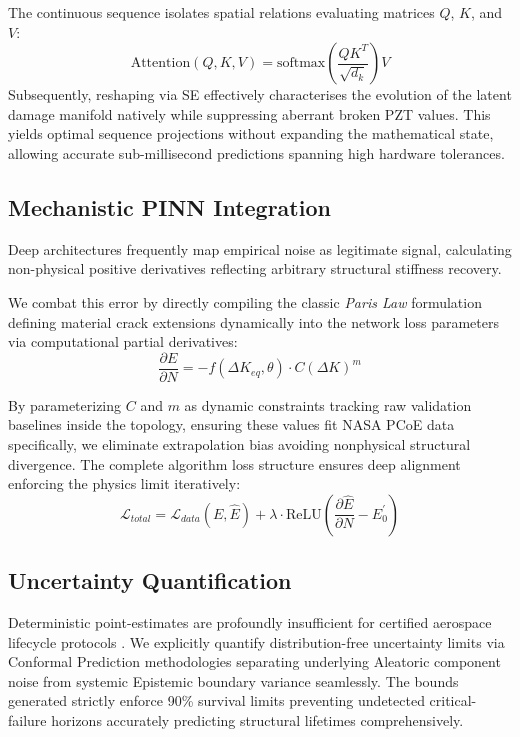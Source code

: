 \documentclass[conference]{IEEEtran}
\begin{document}
The continuous sequence isolates spatial relations evaluating matrices $Q$, $K$, and $V$:
\begin{equation} \label{eq:attention}
\text{Attention}(Q, K, V) = \text{softmax}\left(\frac{QK^T}{\sqrt{d_k}}\right)V
\end{equation}
Subsequently, reshaping via SE effectively characterises the evolution of the latent damage manifold natively while suppressing aberrant broken PZT values. This yields optimal sequence projections without expanding the mathematical state, allowing accurate sub-millisecond predictions spanning high hardware tolerances.

\subsection{Mechanistic PINN Integration}

Deep architectures frequently map empirical noise as legitimate signal, calculating non-physical positive derivatives reflecting arbitrary structural stiffness recovery. 

We combat this error by directly compiling the classic \textit{Paris Law} formulation defining material crack extensions \cite{paris1961critical} dynamically into the network loss parameters via computational partial derivatives:
\begin{equation}
\frac{\partial E}{\partial N} = -f(\Delta K_{eq}, \theta) \cdot C(\Delta K)^m
\end{equation}

By parameterizing $C$ and $m$ as dynamic constraints tracking raw validation baselines inside the topology, ensuring these values fit NASA PCoE data specifically, we eliminate extrapolation bias avoiding nonphysical structural divergence. The complete algorithm loss structure ensures deep alignment enforcing the physics limit iteratively:
\begin{equation}
\mathcal{L}_{total} = \mathcal{L}_{data}(E, \hat{E}) + \lambda \cdot \text{ReLU}\left( \frac{\partial \hat{E}}{\partial N} - E_0^\prime \right)
\end{equation}

\subsection{Uncertainty Quantification}

Deterministic point-estimates are profoundly insufficient for certified aerospace lifecycle protocols \cite{angelopoulos2021gentle}. We explicitly quantify distribution-free uncertainty limits via Conformal Prediction methodologies separating underlying Aleatoric component noise from systemic Epistemic boundary variance seamlessly. The bounds generated strictly enforce 90\% survival limits preventing undetected critical-failure horizons accurately predicting structural lifetimes comprehensively.
\end{document}
